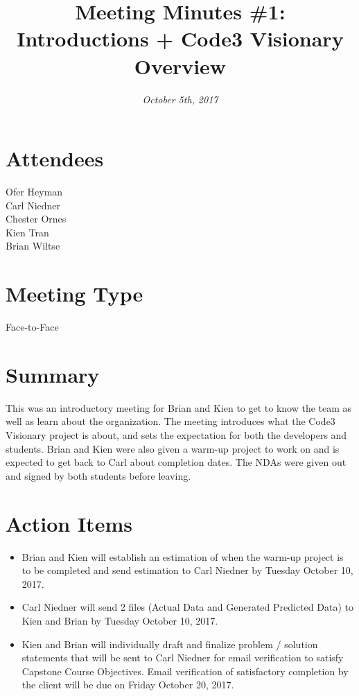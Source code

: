 \documentclass[10pt, onecolumn, draftclsnofoot, letterpaper, compsoc]{IEEEtran}
\title{Meeting Minutes \#1:\\ Introductions + Code3 Visionary Overview}
\author{
	\textit{October 5th, 2017}}
\begin{document}
\maketitle

\section{Attendees}
Ofer Heyman\\
Carl Niedner\\
Chester Ornes\\
Kien Tran\\
Brian Wiltse\\
\section{Meeting Type}
Face-to-Face
\section{Summary}
This was an introductory meeting for Brian and Kien to get to know the team as well as learn about the organization. 
The meeting introduces what the Code3 Visionary project is about, and sets the expectation for both the developers and students. 
Brian and Kien were also given a warm-up project to work on and is expected to get back to Carl about completion dates. 
The NDAs were given out and signed by both students before leaving.
\section{Action Items}
    \begin{itemize}
        \item Brian and Kien will establish an estimation of when the warm-up project is to be completed and send estimation to Carl Niedner by Tuesday October 10, 2017.

        \item Carl Niedner will send 2 files (Actual Data and Generated Predicted Data) to Kien and Brian by Tuesday October 10, 2017.

        \item Kien and Brian will individually draft and finalize problem / solution statements that will be sent to Carl Niedner for email verification to satisfy Capstone Course Objectives. 
        Email verification of satisfactory completion by the client will be due on Friday October 20, 2017.
    \end{itemize}
\end{document}
